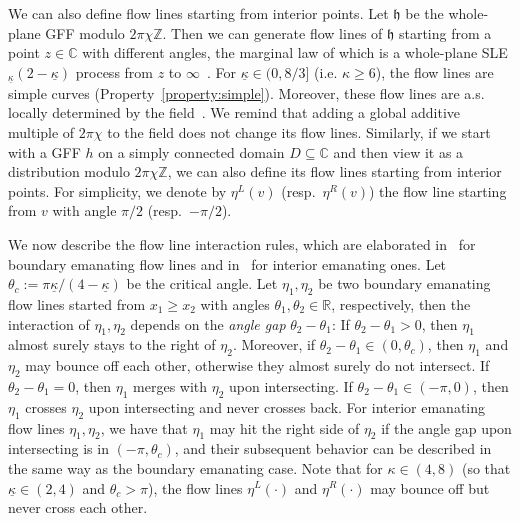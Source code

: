 \documentclass[a4paper]{article}
\numberwithin{equation}{section}
\numberwithin{equation}{section}
\renewcommand{\1}{\mathbf{1}}
\begin{document}
We can also define flow lines starting from interior points. Let $\mathfrak h$ be the whole-plane GFF modulo $2\pi\chi \mathbb Z$. Then we can generate flow lines of $\mathfrak h$ starting from a point $z \in \mathbb C$ with different angles, the marginal law of which is a whole-plane SLE$_{\underline{\kappa}}(2-\underline{\kappa})$ process from $z$ to $\infty$~\cite[Theorem 1.1]{IG4}. For $\underline{\kappa} \in (0,8/3]$ (i.e. $\kappa \ge 6$), the flow lines are simple curves (Property~\eqref{property:simple}). Moreover, these flow lines are a.s. locally determined by the field~\cite[Theorem 1.2]{IG4}. We remind that adding a global additive multiple of $2\pi\chi$ to the field does not change its flow lines. Similarly, if we start with a GFF $h$ on a simply connected domain $D \subseteq \mathbb C$ and then view it as a distribution modulo $2\pi\chi \mathbb Z$, we can also define its flow lines starting from interior points. For simplicity, we denote by $\eta^L(v)$ (resp.\ $\eta^R(v)$) the flow line starting from $v$ with angle $\pi/2$ (resp.\ $-\pi/2$).

We now describe the flow line interaction rules, which are elaborated in~\cite[Theorem 1.5]{IG1} for boundary emanating flow lines and in~\cite[Theorem 1.7]{IG4} for interior emanating ones. Let $\theta_c:=\pi\underline{\kappa}/(4-\underline{\kappa})$ be the critical angle. Let $\eta_1,\eta_2$ be two boundary emanating flow lines started from $x_1 \ge x_2$ with angles $\theta_1,\theta_2 \in \mathbb R$, respectively, then the interaction of $\eta_1,\eta_2$ depends on the \emph{angle gap} $\theta_2-\theta_1$: If $\theta_2-\theta_1>0$, then $\eta_1$ almost surely stays to the right of $\eta_2$. Moreover, if $\theta_2-\theta_1 \in (0,\theta_c)$, then $\eta_1$ and $\eta_2$ may bounce off each other, otherwise they almost surely do not intersect. If $\theta_2-\theta_1=0$, then $\eta_1$ merges with $\eta_2$ upon intersecting. If $\theta_2-\theta_1 \in (-\pi,0)$, then $\eta_1$ crosses $\eta_2$ upon intersecting and never crosses back. For interior emanating flow lines $\eta_1,\eta_2$, we have that $\eta_1$ may hit the right side of $\eta_2$ if the angle gap upon intersecting is in $(-\pi,\theta_c)$, and their subsequent behavior can be described in the same way as the boundary emanating case. Note that for $\kappa \in (4,8)$ (so that $\underline{\kappa} \in (2,4)$ and $\theta_c>\pi$), the flow lines $\eta^L(\cdot)$ and $\eta^R(\cdot)$ may bounce off but never cross each other.
\end{document}
